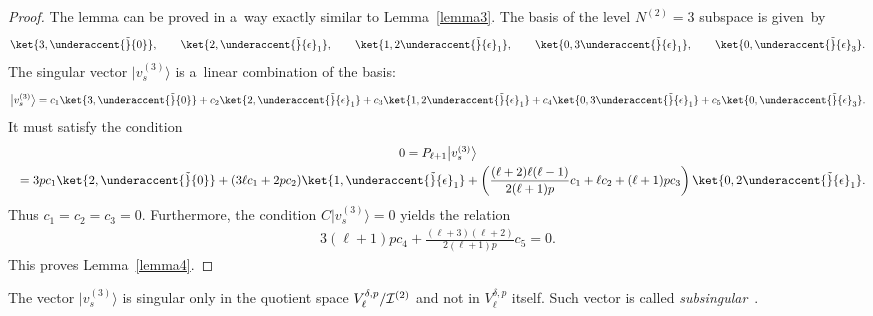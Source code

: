 \begin{proof}
The lemma can be proved in a~way exactly similar to Lemma~\ref{lemma3}.
The basis of the level $ N^{(2)} = 3 $ subspace is given~by
\begin{gather*}
\ket{3,\underaccent{\tilde}{0}},
\qquad
\ket{2,\underaccent{\tilde}{\epsilon}_1},
\qquad
\ket{1,2\underaccent{\tilde}{\epsilon}_1},
\qquad
\ket{0,3\underaccent{\tilde}{\epsilon}_1},
\qquad
\ket{0,\underaccent{\tilde}{\epsilon}_3}.
\end{gather*}
The singular vector $ \big|v_s^{(3)}\big\rangle  $ is a~linear combination of the basis:
\begin{gather*}
\big|v_s^{(3)}\big\rangle  = c_1 \ket{3,\underaccent{\tilde}{0}} + c_2 \ket{2,\underaccent{\tilde}{\epsilon}_1} + c_3
\ket{1,2\underaccent{\tilde}{\epsilon}_1} + c_4 \ket{0,3\underaccent{\tilde}{\epsilon}_1} + c_5
\ket{0,\underaccent{\tilde}{\epsilon}_3}.
\end{gather*}
It must satisfy the condition
\begin{gather*}
0  =  P_{\ell+1} \big|v_s^{(3)}\big\rangle
\\
\hphantom{0}{}
 =  3 p c_1 \ket{2,\underaccent{\tilde}{0}} + (3\ell c_1 + 2p c_2) \ket{1,\underaccent{\tilde}{\epsilon}_1} +
\left(\frac{(\ell+2) \ell (\ell-1)}{2(\ell+1)p} c_1 + \ell c_2 + (\ell+1) p c_3 \right) \ket{0,
2\underaccent{\tilde}{\epsilon}_1}.
\end{gather*}
Thus $ c_1 = c_2 = c_3 = 0$.
Furthermore, the condition $ C \big|v_s^{(3)}\big\rangle  = 0 $ yields the relation
\begin{gather*}
3 (\ell+1) p c_4 + \frac{(\ell+3) (\ell+2)}{2(\ell+1)p} c_5 = 0.
\end{gather*}
This proves  Lemma~\ref{lemma4}.
\end{proof}

The vector $ \big|v_s^{(3)}\big\rangle  $ is singular only in the quotient space $ V^{\delta,p}_{\ell}/{\cal I}^{(2)} $ and not in
$ V^{\delta,p}_{\ell} $ itself.
Such vector is called \textit{subsingular}~\cite{Dob95,Dob97}.

